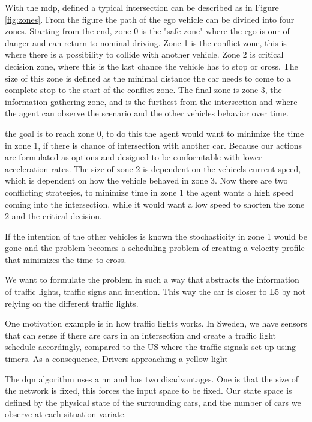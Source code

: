 With the \gls{mdp}, defined a typical intersection can be described as in Figure \ref{fig:zones}. From the figure the path of the ego vehicle can be divided into four zones. Starting from the end, zone 0 is the "safe zone" where the ego is our of danger and can return to nominal driving. Zone 1 is the conflict zone, this is where there is a possibility to collide with another vehicle. Zone 2 is critical decision zone, where this is the last chance the vehicle has to stop or cross. The size of this zone is defined as the minimal distance the car needs to come to a complete stop to the start of the conflict zone. The final zone is zone 3, the information gathering zone, and is the furthest from the intersection and where the agent can observe the scenario and the other vehicles behavior over time. 

the goal is to reach zone 0, 
to do this the agent would want to minimize the time in zone 1, if there is chance of intersection with another car.
Because our actions are formulated as options and designed to be conformtable with lower acceleration rates. The size of zone 2 is dependent on the vehicels current speed, which is dependent on how the vehicle behaved in zone 3. 
Now there are two conflicting strategies, to minimize time in zone 1 the agent wants a high speed coming into the intersection. while it would want a low speed to shorten the zone 2 and the critical decision. 

If the intention of the other vehicles is known the stochasticity in zone 1 would be gone and the problem becomes a scheduling problem of creating a velocity profile that minimizes the time to cross.  

We want to formulate the problem in such a way that abstracts the information of traffic lights, traffic signs and intention. This way the car is closer to L5 by not relying on the different traffic lights.

One motivation example is in how traffic lights works. In Sweden, we have sensors that can sense if there are cars in an intersection and create a traffic light schedule accordingly, compared to the US where the traffic signals set up using timers. As a consequence, Drivers approaching a yellow light 

The \gls{dqn} algorithm uses a \gls{nn} and has two disadvantages. One is that the size of the network is fixed, this forces the input space to be fixed. Our state space is defined by the physical state of the surrounding cars, and the number of cars we observe at each situation variate. %

